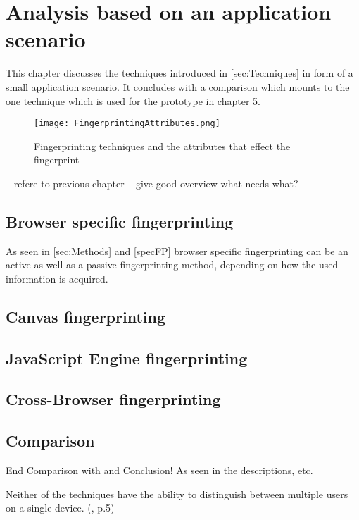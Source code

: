 \chapter{Analysis based on an application scenario}
\label{cha:ApplicationScenario}

This chapter discusses the techniques introduced in \autoref{sec:Techniques} in form of a small application scenario. It concludes with a comparison which mounts to the one technique which is used for the prototype in \hyperref[cha:implementation]{chapter 5}.

\begin{figure}[H]
	\centering
	\texttt{[image: FingerprintingAttributes.png]}
	\caption{Fingerprinting techniques and the attributes that effect the fingerprint}
	\label{BrowserSpecification}
\end{figure}

-- refere to previous chapter
-- give good overview what needs what?

\section{Browser specific fingerprinting}
As seen in \autoref{sec:Methods} and \autoref{specFP} browser specific fingerprinting can be an active as well as a passive fingerprinting method, depending on how the used information is acquired.


\section{Canvas fingerprinting}


\section{JavaScript Engine fingerprinting}

\section{Cross-Browser fingerprinting}

\section{Comparison}
End Comparison with and Conclusion!
As seen in the descriptions, etc.

Neither of the techniques have the ability to distinguish between multiple users on a single device.  (\textcite{upi15}, p.5)

